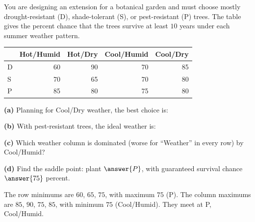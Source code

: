 \documentclass[12pt]{ximera}
\begin{document}
\begin{problem}
You are designing an extension for a botanical garden and must choose mostly
drought-resistant (D), shade-tolerant (S), or pest-resistant (P) trees. The table gives
the percent chance that the trees survive at least $10$ years under each summer weather
pattern.
\begin{center}
\begin{tabular}{l|rrrr}
 & Hot/Humid & Hot/Dry & Cool/Humid & Cool/Dry\\\hline
D & 60 & 90 & 70 & 85\\
S & 70 & 65 & 70 & 80\\
P & 85 & 80 & 75 & 80
\end{tabular}
\end{center}

\begin{prompt}
\textbf{(a)} Planning for Cool/Dry weather, the best choice is:
\begin{multipleChoice}
\end{multipleChoice}
\end{prompt}

\begin{prompt}
\textbf{(b)} With pest-resistant trees, the ideal weather is:
\begin{multipleChoice}
\end{multipleChoice}
\end{prompt}

\begin{prompt}
\textbf{(c)} Which weather column is dominated (worse for ``Weather'' in every row) by
Cool/Humid?
\begin{multipleChoice}
\end{multipleChoice}
\end{prompt}

\begin{prompt}
\textbf{(d)} Find the saddle point: plant $\answer{P}$, with guaranteed survival chance
$\answer{75}$ percent.
\begin{feedback}
The row minimums are $60$, $65$, $75$, with maximum $75$ (P). The column maximums are $85$,
$90$, $75$, $85$, with minimum $75$ (Cool/Humid). They meet at P, Cool/Humid.
\end{feedback}
\end{prompt}
\end{problem}
\end{document}
